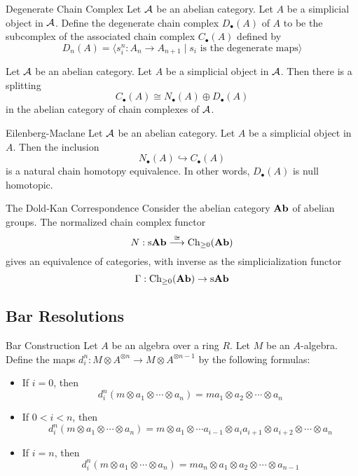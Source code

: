 \documentclass[a4paper]{article}
\begin{document}
\begin{defn}{Degenerate Chain Complex}{} Let $\mathcal{A}$ be an abelian category. Let $A$ be a simplicial object in $\mathcal{A}$. Define the degenerate chain complex $D_\bullet(A)$ of $A$ to be the subcomplex of the associated chain complex $C_\bullet(A)$ defined by $$D_n(A)=\langle s_i^n:A_n\to A_{n+1}\;|\;s_i\text{ is the degenerate maps}\rangle$$
\end{defn}

\begin{prp}{}{} Let $\mathcal{A}$ be an abelian category. Let $A$ be a simplicial object in $\mathcal{A}$. Then there is a splitting $$C_\bullet(A)\cong N_\bullet(A)\oplus D_\bullet(A)$$ in the abelian category of chain complexes of $\mathcal{A}$. 
\end{prp}

\begin{thm}{Eilenberg-Maclane}{} Let $\mathcal{A}$ be an abelian category. Let $A$ be a simplicial object in $A$. Then the inclusion $$N_\bullet(A)\hookrightarrow C_\bullet(A)$$ is a natural chain homotopy equivalence. In other words, $D_\bullet(A)$ is null homotopic. 
\end{thm}

\begin{thm}{The Dold-Kan Correspondence}{} Consider the abelian category $\bold{Ab}$ of abelian groups. The normalized chain complex functor $$N:\text{s}\bold{Ab}\overset{\cong}{\longrightarrow}\text{Ch}_{\geq 0}(\bold{Ab})$$ gives an equivalence of categories, with inverse as the simplicialization functor $$\Gamma:\text{Ch}_{\geq 0}(\bold{Ab})\to\text{s}\bold{Ab}$$
\end{thm}

\subsection{Bar Resolutions}
\begin{defn}{Bar Construction}{} Let $A$ be an algebra over a ring $R$. Let $M$ be an $A$-algebra. Define the maps $d_i^n:M\otimes A^{\otimes n}\to M\otimes A^{\otimes n-1}$ by the following formulas: 
\begin{itemize}
\item If $i=0$, then $$d_i^n(m\otimes a_1\otimes\cdots\otimes a_n)=ma_1\otimes a_2\otimes\cdots\otimes a_n$$
\item If $0<i<n$, then $$d_i^n(m\otimes a_1\otimes\cdots\otimes a_n)=m\otimes a_1\otimes\cdots a_{i-1}\otimes a_ia_{i+1}\otimes a_{i+2}\otimes\cdots\otimes a_n$$
\item If $i=n$, then $$d_i^n(m\otimes a_1\otimes\cdots\otimes a_n)=ma_n\otimes a_1\otimes a_2\otimes\cdots\otimes a_{n-1}$$
\end{itemize}
\end{defn}
\end{document}
